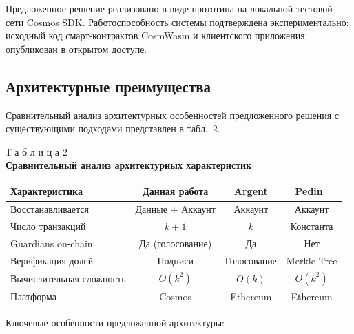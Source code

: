 Предложенное решение реализовано в виде прототипа на локальной тестовой сети Cosmos SDK. Работоспособность системы подтверждена экспериментально; исходный код смарт-контрактов CosmWasm и клиентского приложения опубликован в открытом доступе.

\subsection{Архитектурные преимущества}

Сравнительный анализ архитектурных особенностей предложенного решения с существующими подходами представлен в табл.~2.

\begin{table}[h]
\begin{flushright}
{Т а б л и ц а 2}\\
\centering
\textbf{Сравнительный анализ архитектурных характеристик}
\end{flushright}
\centering
\begin{tabular}{|l|c|c|c|}
\hline
\textbf{Характеристика} & \textbf{Данная работа} & \textbf{Argent} & \textbf{Pedin~\cite{s15}} \\
\hline
Восстанавливается & Данные + Аккаунт & Аккаунт & Аккаунт \\
\hline
Число транзакций & $k+1$ & $k$ & Константа \\
\hline
Guardians on-chain & Да (голосование) & Да & Нет \\
\hline
Верификация долей & Подписи & Голосование & Merkle Tree \\
\hline
Вычислительная сложность & $O(k^2)$ & $O(k)$ & $O(k^2)$ \\
\hline
Платформа & Cosmos & Ethereum & Ethereum \\
\hline
\end{tabular}
\end{table}

Ключевые особенности предложенной архитектуры:

